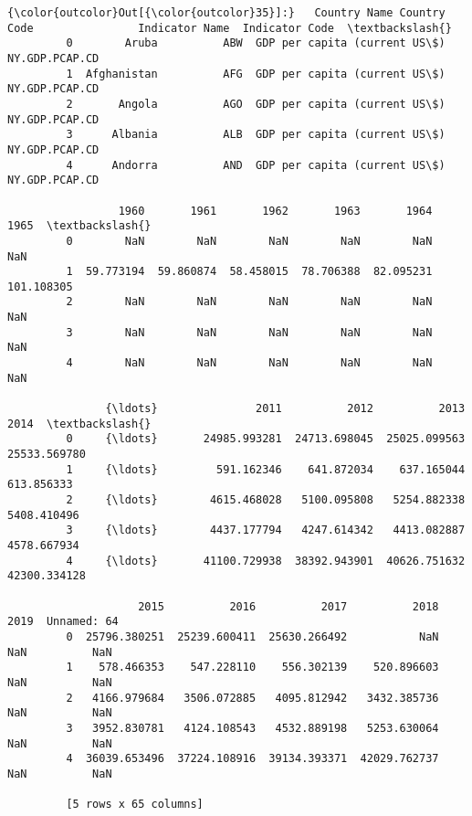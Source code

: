 \documentclass[11pt]{article}
\begin{document}
\begin{Verbatim}[commandchars=\\\{\}]
{\color{outcolor}Out[{\color{outcolor}35}]:}   Country Name Country Code                Indicator Name  Indicator Code  \textbackslash{}
         0        Aruba          ABW  GDP per capita (current US\$)  NY.GDP.PCAP.CD   
         1  Afghanistan          AFG  GDP per capita (current US\$)  NY.GDP.PCAP.CD   
         2       Angola          AGO  GDP per capita (current US\$)  NY.GDP.PCAP.CD   
         3      Albania          ALB  GDP per capita (current US\$)  NY.GDP.PCAP.CD   
         4      Andorra          AND  GDP per capita (current US\$)  NY.GDP.PCAP.CD   
         
                 1960       1961       1962       1963       1964        1965  \textbackslash{}
         0        NaN        NaN        NaN        NaN        NaN         NaN   
         1  59.773194  59.860874  58.458015  78.706388  82.095231  101.108305   
         2        NaN        NaN        NaN        NaN        NaN         NaN   
         3        NaN        NaN        NaN        NaN        NaN         NaN   
         4        NaN        NaN        NaN        NaN        NaN         NaN   
         
               {\ldots}               2011          2012          2013          2014  \textbackslash{}
         0     {\ldots}       24985.993281  24713.698045  25025.099563  25533.569780   
         1     {\ldots}         591.162346    641.872034    637.165044    613.856333   
         2     {\ldots}        4615.468028   5100.095808   5254.882338   5408.410496   
         3     {\ldots}        4437.177794   4247.614342   4413.082887   4578.667934   
         4     {\ldots}       41100.729938  38392.943901  40626.751632  42300.334128   
         
                    2015          2016          2017          2018  2019  Unnamed: 64  
         0  25796.380251  25239.600411  25630.266492           NaN   NaN          NaN  
         1    578.466353    547.228110    556.302139    520.896603   NaN          NaN  
         2   4166.979684   3506.072885   4095.812942   3432.385736   NaN          NaN  
         3   3952.830781   4124.108543   4532.889198   5253.630064   NaN          NaN  
         4  36039.653496  37224.108916  39134.393371  42029.762737   NaN          NaN  
         
         [5 rows x 65 columns]
\end{Verbatim}
            
\end{document}
